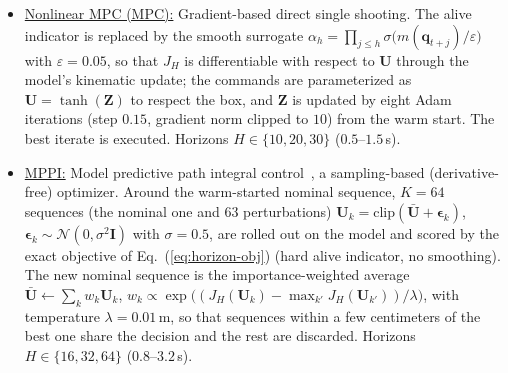 \documentclass[journal, twoside]{IEEEtran}
\begin{document}
\begin{itemize}[leftmargin=1em]
\renewcommand{\labelitemi}{$\triangleright$}

    \item \uline{Nonlinear MPC (MPC):}
    Gradient-based direct single shooting. The alive indicator is
    replaced by the smooth surrogate
    $\alpha_h=\prod_{j\le h}\sigma\!\bigl(m(\mathbf{q}_{t+j})/\varepsilon\bigr)$
    with $\varepsilon=0.05$, so that $J_H$ is differentiable with respect to
    $\mathbf{U}$ through the model's kinematic update; the commands are
    parameterized as $\mathbf{U}=\tanh(\mathbf{Z})$ to respect the box,
    and $\mathbf{Z}$ is updated by eight Adam iterations
    (step $0.15$, gradient norm clipped to $10$) from the warm start. The
    best iterate is executed. Horizons $H\in\{10,20,30\}$
    ($0.5$--$1.5$\,s).

    \item \uline{MPPI:}
    Model predictive path integral control~\cite{williams2018mppi}, a
    sampling-based (derivative-free) optimizer. Around the warm-started
    nominal sequence, $K=64$ sequences (the nominal one and $63$ perturbations)
    $\mathbf{U}_k=\mathrm{clip}(\bar{\mathbf{U}}+\boldsymbol{\epsilon}_k)$,
    $\boldsymbol{\epsilon}_k\sim\mathcal{N}(0,\sigma^2\mathbf{I})$ with
    $\sigma=0.5$, are rolled out on the model and scored by the exact
    objective of Eq.~(\ref{eq:horizon-obj}) (hard alive indicator, no
    smoothing). The new nominal sequence is the importance-weighted
    average
    $\bar{\mathbf{U}}\leftarrow\sum_k w_k\mathbf{U}_k$,
    $w_k\propto\exp\bigl((J_H(\mathbf{U}_k)-\max_{k'}J_H(\mathbf{U}_{k'}))/\lambda\bigr)$,
    with temperature $\lambda=0.01$\,m, so that sequences within a few
    centimeters of the best one share the decision and the rest are
    discarded. Horizons $H\in\{16,32,64\}$ ($0.8$--$3.2$\,s).
\end{itemize}
\end{document}
